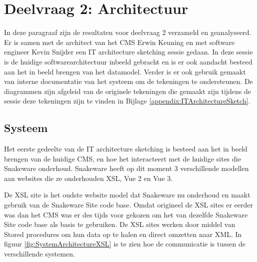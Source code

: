 \section{Deelvraag 2: Architectuur}
In deze paragraaf zijn de resultaten voor deelvraag 2 \textit{\SubquestionTwo} verzameld en geanalyseerd.
Er is samen met de architect van het CMS Erwin Keuning en met software engineer Kevin Snijder een IT architecture sketching sessie gedaan.
In deze sessie is de huidige softwarearchitectuur inbeeld gebracht en is er ook aandacht besteed aan het in beeld brengen van het datamodel.
Verder is er ook gebruik gemaakt van interne documentatie van het systeem om de tekeningen te ondersteunen.
De diagrammen zijn afgeleid van de originele tekeningen die gemaakt zijn tijdens de sessie deze tekeningen zijn te vinden in Bijlage \ref{appendix:ITArchitectureSketch}.

\subsection{Systeem}
Het eerste gedeelte van de IT architecture sketching is besteed aan het in beeld brengen van de huidige CMS, en hoe het interacteert met de huidige sites die Snakeware onderhoud.
Snakeware heeft op dit moment 3 verschillende modellen aan websites die ze onderhouden \gls{XSL}, Vue 2 en Vue 3.

\whitespace
De \gls{XSL} site is het oudste website model dat Snakeware nu onderhoud en maakt gebruik van de Snakeware Site code base.
Omdat origineel de \gls{XSL} sites er eerder was dan het \gls{CMS} was er des tijds voor gekozen om het van dezelfde Snakeware Site code base als basis te gebruiken.
De \gls{XSL} sites werken door middel van \gls{Stored procedures} om hun data op te halen en direct omzetten naar XML.
In figuur  \ref{fig:SystemArchitectureXSL} is te zien hoe de communicatie is tussen de verschillende systemen.
%
%

